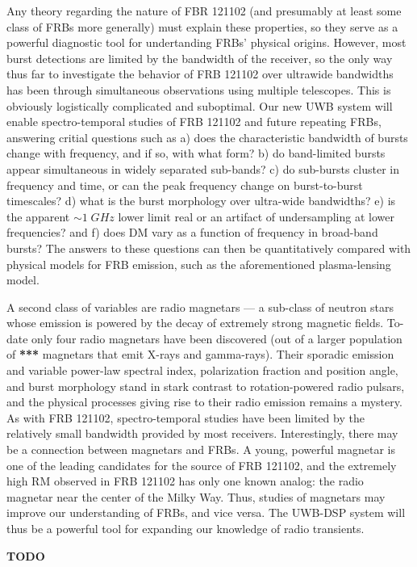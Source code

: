 \documentclass[10pt]{myNSF}
\begin{document}
Any theory regarding the nature of FBR 121102 (and presumably at least
some class of FRBs more generally) must explain these properties, so
they serve as a powerful diagnostic tool for undertanding FRBs'
physical origins.  However, most burst detections are limited by the
bandwidth of the receiver, so the only way thus far to investigate the
behavior of FRB 121102 over ultrawide bandwidths has been through
simultaneous observations using multiple telescopes.  This is
obviously logistically complicated and suboptimal.  Our new UWB system
will enable spectro-temporal studies of FRB 121102 and future
repeating FRBs, answering critial questions such as a) does the
characteristic bandwidth of bursts change with frequency, and if so,
with what form? b) do band-limited bursts appear simultaneous in
widely separated sub-bands? c) do sub-bursts cluster in frequency and
time, or can the peak frequency change on burst-to-burst timescales?
d) what is the burst morphology over ultra-wide bandwidths? e) is the
apparent $\sim 1\; GHz$ lower limit real or an artifact of
undersampling at lower frequencies? and f) does DM vary as a function
of frequency in broad-band bursts?  The answers to these questions can
then be quantitatively compared with physical models for FRB emission,
such as the aforementioned plasma-lensing model.

A second class of variables are radio magnetars --- a sub-class of
neutron stars whose emission is powered by the decay of extremely
strong magnetic fields.  To-date only four radio magnetars have been
discovered (out of a larger population of \textbf{***} magnetars that
emit X-rays and gamma-rays).  Their sporadic emission and variable
power-law spectral index, polarization fraction and position angle,
and burst morphology stand in stark contrast to rotation-powered radio
pulsars, and the physical processes giving rise to their radio
emission remains a mystery.  As with FRB 121102, spectro-temporal
studies have been limited by the relatively small bandwidth provided
by most receivers.  Interestingly, there may be a connection between
magnetars and FRBs.  A young, powerful magnetar is one of the leading
candidates for the source of FRB 121102, and the extremely high RM
observed in FRB 121102 has only one known analog: the radio magnetar
near the center of the Milky Way.  Thus, studies of magnetars may
improve our understanding of FRBs, and vice versa.  The UWB-DSP system
will thus be a powerful tool for expanding our knowledge of radio
transients.

 \textbf{TODO}
\end{document}
